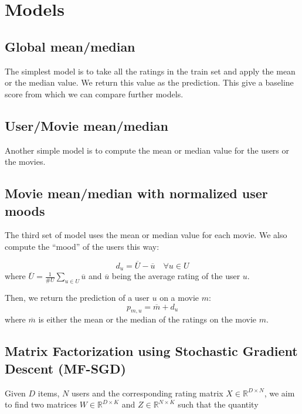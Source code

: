 \documentclass[10pt,conference,compsocconf]{IEEEtran}
\begin{document}
\section{Models}

\subsection{Global mean/median}

The simplest model is to take all the ratings in the train set and apply the mean or the median value. We return this value as the prediction. This give a baseline score from which we can compare further models.

\subsection{User/Movie mean/median}

Another simple model is to compute the mean or median value for the users or the movies.

\subsection{Movie mean/median with normalized user moods}

The third set of model uses the mean or median value for each movie. We also compute the ``mood'' of the users this way:

\begin{equation}
 d_u = \overline{U} - \overline{u} \quad \forall u\in U
\end{equation}
where $\overline{U} = \frac{1}{\#U} \sum_{u\in U} \overline{u}$ and $\overline{u}$ being the average rating of the user $u$.

Then, we return the prediction of a user $u$ on a movie $m$:
\begin{equation}
 p_{m,u} = \overline{m} + d_u
\end{equation}
where $\overline{m}$ is either the mean or the median of the ratings on the movie $m$.

\subsection{Matrix Factorization using Stochastic Gradient Descent (MF-SGD)}
\label{sec:mf-sgd}
Given $D$ items, $N$ users and the corresponding rating matrix 
$X \in \mathbb{R}^{D \times N}$, we aim to find two matrices $W \in \mathbb{R}^{D \times K}$ and $Z
\in \mathbb{R}^{N \times K}$ such that the quantity 
\end{document}

